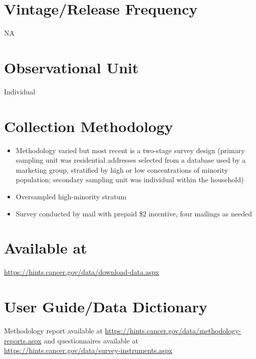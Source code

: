 \documentclass[
]{book}
\providecommand{\tightlist}{%
  \setlength{\itemsep}{0pt}\setlength{\parskip}{0pt}}
\begin{document}
\hypertarget{vintagerelease-frequency-32}{%
\section{Vintage/Release Frequency}\label{vintagerelease-frequency-32}}

NA

\hypertarget{observational-unit-32}{%
\section{Observational Unit}\label{observational-unit-32}}

Individual

\hypertarget{collection-methodology-32}{%
\section{Collection Methodology}\label{collection-methodology-32}}

\begin{itemize}
\tightlist
\item
  Methodology varied but most recent is a two-stage survey design (primary sampling unit was residential addresses selected from a database used by a marketing group, stratified by high or low concentrations of minority population; secondary sampling unit was individual within the household)
\item
  Oversampled high-minority stratum
\item
  Survey conducted by mail with prepaid \$2 incentive, four mailings as needed
\end{itemize}

\hypertarget{available-at-32}{%
\section{Available at}\label{available-at-32}}

\url{https://hints.cancer.gov/data/download-data.aspx}

\hypertarget{user-guidedata-dictionary-32}{%
\section{User Guide/Data Dictionary}\label{user-guidedata-dictionary-32}}

Methodology report available at \url{https://hints.cancer.gov/data/methodology-reports.aspx} and questionnaires available at \url{https://hints.cancer.gov/data/survey-instruments.aspx}
\end{document}
